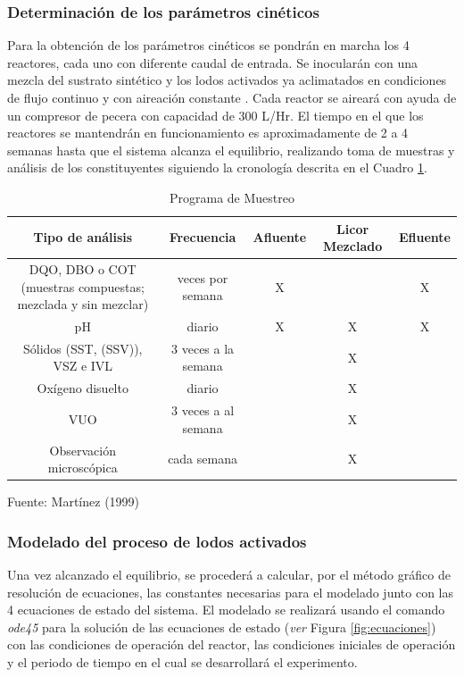 \subsubsection*{Determinación de los parámetros cinéticos}
Para la obtención de los parámetros cinéticos se pondrán en marcha los 4 reactores, cada uno con diferente caudal de entrada. Se inocularán con una mezcla del sustrato sintético y los lodos activados ya aclimatados en condiciones de flujo continuo y con aireación constante \citep{delgadillo}. Cada reactor se aireará con ayuda de un compresor de pecera con capacidad de 300 L/Hr. El tiempo en el que los reactores se mantendrán en funcionamiento es aproximadamente de 2 a 4 semanas hasta que el sistema alcanza el equilibrio, realizando toma de muestras y análisis de los constituyentes siguiendo la cronología descrita en el Cuadro \ref{tab:muestreo}.
	\begin{table}[!h]
		\begin{center}
		\caption{Programa de Muestreo}
		\label{tab:muestreo}
		\begin{scriptsize}
			\begin{tabular}{|c|c|c|c|c|}
			\hline
			\rowcolor{blanc}
			Tipo de análisis & Frecuencia & Afluente & \multicolumn{1}{|m{2cm}|}{\centering Licor Mezclado} & Efluente \\
			\hline
			\multicolumn{1}{|m{5cm}|}{\centering DQO, DBO o COT (muestras compuestas; mezclada y sin mezclar)} & \multicolumn{1}{m{3cm}|}{\centering 3 veces por semana} & \multicolumn{1}{m{1.5cm}|}{\centering X} & \multicolumn{1}{m{2cm}|}{\centering } & \multicolumn{1}{m{1.5cm}|}{\centering X} \\
			\hline
			pH & diario & X & X & X \\
			\hline
			Sólidos (SST, (SSV)), VSZ e IVL & 3 veces a la semana & & X & \\
			\hline
			Oxígeno disuelto & diario & & X & \\
			\hline
			VUO & 3 veces a al semana & & X & \\
			\hline
			Observación microscópica & cada semana & & X & \\
			\hline
			\end{tabular}
		\end{scriptsize}
		\small{Fuente: Martínez (1999)}
		\end{center}
	\end{table}
\subsubsection*{Modelado del proceso de lodos activados}
Una vez alcanzado el equilibrio, se procederá a calcular, por el método gráfico de resolución de ecuaciones, las constantes necesarias para el modelado junto con las 4 ecuaciones de estado del sistema. El modelado se realizará usando el comando \emph{ode45} para la solución de las ecuaciones de estado (\emph{ver} Figura \ref{fig:ecuaciones}) con las condiciones de operación del reactor, las condiciones iniciales de operación y el periodo de tiempo en el cual se desarrollará el experimento.

